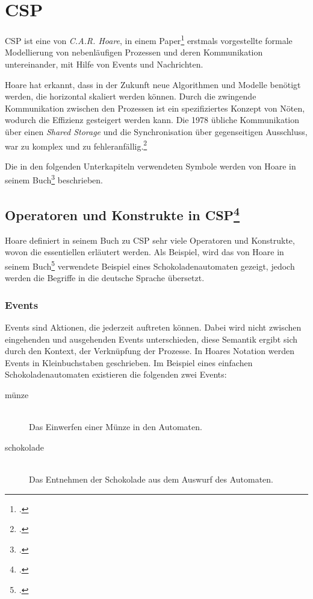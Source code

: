 \section{\acl{CSP}}
\acf{CSP} ist eine von \textit{C.A.R. Hoare}, in einem Paper\footcite{CSP} erstmals vorgestellte formale Modellierung von nebenläufigen Prozessen und deren Kommunikation untereinander, mit Hilfe von Events und Nachrichten.

Hoare hat erkannt, dass in der Zukunft neue Algorithmen und Modelle benötigt werden, die horizontal skaliert werden können. Durch die zwingende Kommunikation zwischen den Prozessen ist ein spezifiziertes Konzept von Nöten, wodurch die Effizienz gesteigert werden kann. Die 1978 übliche Kommunikation über einen \textit{Shared Storage} und die Synchronisation über gegenseitigen Ausschluss, war zu komplex und zu fehleranfällig.\footcite[Introduction]{CSP}

Die in den folgenden Unterkapiteln verwendeten Symbole werden von Hoare in seinem Buch\footcite[Glossary of Symbols]{CSPBOOK} beschrieben.

\subsection[Operatoren und Konstrukte in \acs{CSP}]{Operatoren und Konstrukte in \acs{CSP}\footcite[Siehe][Kap. 1.1]{CSPBOOK}}

Hoare definiert in seinem Buch zu \ac{CSP} sehr viele Operatoren und Konstrukte, wovon die essentiellen  erläutert werden. Als Beispiel, wird das von Hoare in seinem Buch\footcite{CSPBOOK} verwendete Beispiel eines Schokoladenautomaten gezeigt, jedoch werden die Begriffe in die deutsche Sprache übersetzt.

\subsubsection{Events}
Events sind Aktionen, die jederzeit auftreten können. Dabei wird nicht zwischen eingehenden und ausgehenden Events unterschieden, diese Semantik ergibt sich durch den Kontext, der Verknüpfung der Prozesse. In Hoares Notation werden Events in Kleinbuchstaben geschrieben.
Im Beispiel eines einfachen Schokoladenautomaten existieren die folgenden zwei Events:

\begin{description}
\item[münze]\hfill \\
Das Einwerfen einer Münze in den Automaten.
\item[schokolade]\hfill \\
Das Entnehmen der Schokolade aus dem Auswurf des Automaten.
\end{description}

